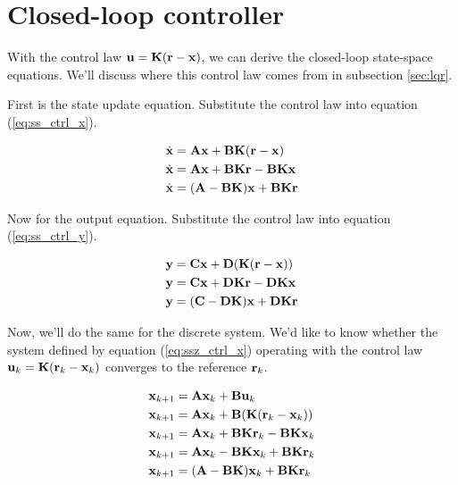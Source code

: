 \section{Closed-loop controller}

With the \gls{control law} $\mathbf{u} = \mathbf{K}(\mathbf{r} - \mathbf{x})$, we can derive
the closed-loop state-space equations. We'll discuss where this control law
comes from in subsection \ref{sec:lqr}.

First is the state update equation. Substitute the control law into equation
(\ref{eq:ss_ctrl_x}).

\begin{align}
  \dot{\mathbf{x}} &= \mathbf{A}\mathbf{x} + \mathbf{B}\mathbf{K}(\mathbf{r} - \mathbf{x}) \nonumber
    \\
  \dot{\mathbf{x}} &= \mathbf{A}\mathbf{x} + \mathbf{B}\mathbf{K}\mathbf{r} -
    \mathbf{B}\mathbf{K}\mathbf{x} \nonumber \\
  \dot{\mathbf{x}} &= (\mathbf{A} - \mathbf{B}\mathbf{K})\mathbf{x} + \mathbf{B}\mathbf{K}\mathbf{r}
\end{align}

Now for the output equation. Substitute the control law into equation
(\ref{eq:ss_ctrl_y}).

\begin{align}
  \mathbf{y} &= \mathbf{C}\mathbf{x} + \mathbf{D}(\mathbf{K}(\mathbf{r} - \mathbf{x})) \nonumber \\
  \mathbf{y} &= \mathbf{C}\mathbf{x} + \mathbf{D}\mathbf{K}\mathbf{r} - \mathbf{D}\mathbf{K}\mathbf{x}
    \nonumber \\
  \mathbf{y} &= (\mathbf{C} - \mathbf{D}\mathbf{K})\mathbf{x} + \mathbf{D}\mathbf{K}\mathbf{r}
\end{align}

Now, we'll do the same for the discrete system. We'd like to know whether the
\gls{system} defined by equation (\ref{eq:ssz_ctrl_x}) operating with the
\gls{control law} $\mathbf{u}_k = \mathbf{K}(\mathbf{r}_k - \mathbf{x}_k)$ converges to the
\gls{reference} $\mathbf{r}_k$.

\begin{align*}
  \mathbf{x}_{k+1} &= \mathbf{A}\mathbf{x}_k + \mathbf{B}\mathbf{u}_k \\
  \mathbf{x}_{k+1} &= \mathbf{A}\mathbf{x}_k + \mathbf{B}(\mathbf{K}(\mathbf{r}_k - \mathbf{x}_k)) \\
  \mathbf{x}_{k+1} &= \mathbf{A}\mathbf{x}_k + \mathbf{B}\mathbf{K}\mathbf{r}_k -
    \mathbf{B}\mathbf{K}\mathbf{x}_k \\
  \mathbf{x}_{k+1} &= \mathbf{A}\mathbf{x}_k - \mathbf{B}\mathbf{K}\mathbf{x}_k +
    \mathbf{B}\mathbf{K}\mathbf{r}_k \\
  \mathbf{x}_{k+1} &= (\mathbf{A} - \mathbf{B}\mathbf{K})\mathbf{x}_k + \mathbf{B}\mathbf{K}\mathbf{r}_k
\end{align*}

